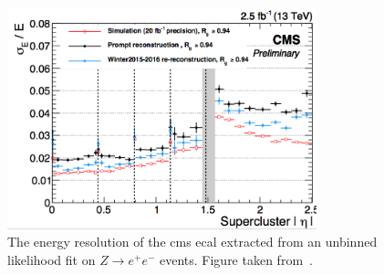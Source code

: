 \begin{figure}[hpb!]
	\centering
	\includegraphics[width=0.8\textwidth]{Figures/CMSECALRES2}
	\caption[The energy resolution of the \acrshort{cms} \acrshort{ecal} extracted from an unbinned likelihood fit on $Z\rightarrow e^+e^-$ events.]{The energy resolution of the \acrshort{cms} \acrshort{ecal} extracted from an unbinned likelihood fit on $Z\rightarrow e^+e^-$ events. Figure taken from~\cite{CMSECALRESMEAS}.}
	\label{fig:CMSECALRes2}
\end{figure}



